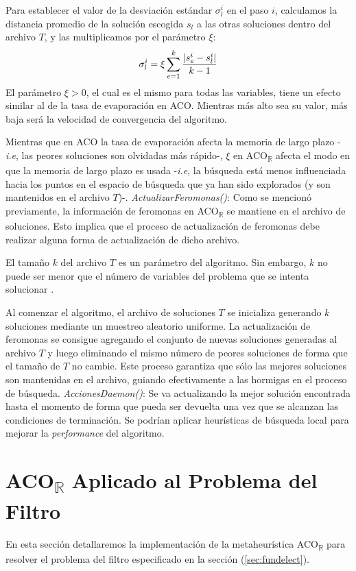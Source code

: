\documentclass{llncs}
\DeclarePairedDelimiter\abs{\lvert}{\rvert}
\begin{document}
	Para establecer el valor de la desviación estándar $\sigma^i_l$ en el paso $i$, calculamos la distancia promedio de la solución
	escogida $s_l$ a las otras soluciones dentro del archivo $T$, y las multiplicamos por el parámetro $\xi$:
	\begin{equation*}
	\sigma^i_l = \xi \sum_{e=1}^{k}\frac{\abs{s^i_e - s^i_l}}{k-1}
	\end{equation*}
	El parámetro $\xi > 0$, el cual es el mismo para todas las variables, tiene un efecto similar al de la tasa de evaporación en ACO. Mientras
	más alto sea su valor, más baja será la velocidad de convergencia del algoritmo.
	 
	Mientras que en ACO la tasa de evaporación afecta la memoria de largo plazo -\textit{i.e}, las peores soluciones son olvidadas más rápido-, $\xi$ en ACO\textsubscript{$\mathbb{R}$} afecta el modo en que la memoria de largo plazo es usada -\textit{i.e}, la búsqueda está menos influenciada hacia los puntos en el espacio de búsqueda que ya han sido explorados (y son mantenidos en el archivo $T$)-.
	\bigbreak	
	\textit{ActualizarFeromonas()}: Como se mencionó previamente, la información de feromonas en ACO\textsubscript{$\mathbb{R}$} se mantiene
	en el archivo de soluciones. Esto implica que el proceso de actualización de feromonas debe realizar alguna forma de actualización
	de dicho archivo.
	
	El tamaño $k$ del archivo $T$ es un parámetro del algoritmo. Sin embargo, $k$ no puede ser menor que el número de variables
	del problema que se intenta solucionar \cite{soc:dor}.
	
	Al comenzar el algoritmo, el archivo de soluciones $T$ se inicializa generando $k$ soluciones mediante un muestreo aleatorio uniforme.
	La actualización de feromonas se consigue agregando el conjunto de nuevas soluciones generadas al archivo $T$ y luego eliminando
	el mismo número de peores soluciones de forma que el tamaño de $T$ no cambie. Este proceso garantiza que sólo las mejores
	soluciones son mantenidas en el archivo, guiando efectivamente a las hormigas en el proceso de búsqueda.
	\bigbreak
	\textit{AccionesDaemon()}: Se va actualizando la mejor solución encontrada hasta el momento de forma que pueda ser devuelta
	una vez que se alcanzan las condiciones de terminación. Se podrían aplicar heurísticas de búsqueda local para mejorar la \textit{performance} del algoritmo.
	
	\section{\textbf{ACO\textsubscript{$\mathbb{R}$} Aplicado al Problema del Filtro}}
	En esta sección detallaremos la implementación de la metaheurística ACO\textsubscript{$\mathbb{R}$} 
	para resolver el problema del filtro especificado en la sección (\ref{sec:fundelect}).
	
\end{document}
